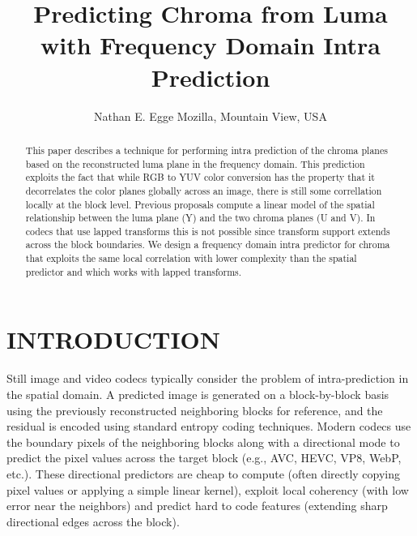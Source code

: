 \documentclass[a4paper]{spie}  %
\title{Predicting Chroma from Luma with Frequency Domain Intra Prediction}
\author{Nathan E. Egge
\skiplinehalf
Mozilla, Mountain View, USA
}
\begin{document}
 
  \maketitle 

\begin{abstract}
This paper describes a technique for performing intra prediction of the chroma
 planes based on the reconstructed luma plane in the frequency domain.
This prediction exploits the fact that while RGB to YUV color conversion has
 the property that it decorrelates the color planes globally across an image,
 there is still some correllation locally at the block level\cite{LeeCho09}.
Previous proposals compute a linear model of the spatial relationship between
 the luma plane (Y) and the two chroma planes (U and V)\cite{JCTVCB021}.
In codecs that use lapped transforms this is not possible since transform
 support extends across the block boundaries\cite{Tran2003}.
We design a frequency domain intra predictor for chroma that exploits the same
 local correlation with lower complexity than the spatial predictor and which
 works with lapped transforms.


\end{abstract}



\section{INTRODUCTION}
\label{sec:intro}  %

Still image and video codecs typically consider the problem of intra-prediction
 in the spatial domain.
A predicted image is generated on a block-by-block basis using the previously
 reconstructed neighboring blocks for reference, and the residual is encoded
 using standard entropy coding techniques.
Modern codecs use the boundary pixels of the neighboring blocks along with a
 directional mode to predict the pixel values across the target block (e.g.,
 AVC, HEVC, VP8, WebP, etc.).
These directional predictors are cheap to compute (often directly copying pixel
 values or applying a simple linear kernel), exploit local coherency (with low
 error near the neighbors) and predict hard to code features (extending sharp
 directional edges across the block).
\end{document}
